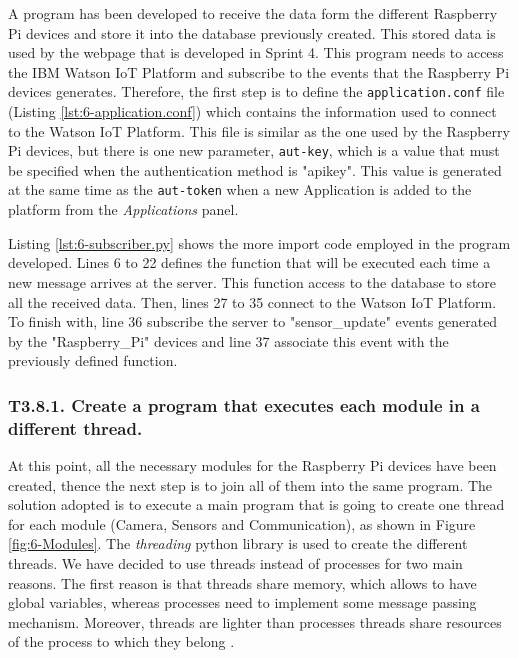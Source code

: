 A program has been developed to receive the data form the different Raspberry Pi devices and store it into the database previously created. This stored data is used by the webpage that is developed in Sprint 4. This program needs to access the IBM Watson IoT Platform and subscribe to the events that the Raspberry Pi devices generates. Therefore, the first step is to define the  \texttt{application.conf} file (Listing \ref{lst:6-application.conf}) which contains the information used to connect to the Watson IoT Platform. This file is similar as the one used by the Raspberry Pi devices, but there is one new parameter, \texttt{aut-key}, which is a value that must be specified when the authentication method is "apikey". This value is generated at the same time as the \texttt{aut-token} when a new Application is added to the platform from the \textit{Applications} panel.

 


Listing \ref{lst:6-subscriber.py} shows the more import code employed in the program developed. Lines 6 to 22 defines the function that will be executed each time a new message arrives at the server. This function access to the database to store all the received data. Then, lines 27 to 35 connect to the Watson IoT Platform. To finish with, line 36 subscribe the server to "sensor\_update" events generated by the "Raspberry\_Pi" devices and line 37 associate this event with the previously defined function.




\subsubsection{T3.8.1. Create a program that executes each module in a different thread.}

At this point, all the necessary modules for the Raspberry Pi devices have been created,  thence the next step is to join all of them into the same program. The solution adopted is to execute a main program that is going to create one thread for each module (Camera, Sensors and Communication), as shown in Figure \ref{fig:6-Modules}. The \textit{threading} python library is used to create the different threads. We have decided to use threads instead of processes for two main reasons. The first reason is that threads share memory, which allows to have global variables, whereas processes need to implement some message passing mechanism. Moreover, threads are lighter than processes threads share resources of the process to which they belong \cite{SGG06}.

